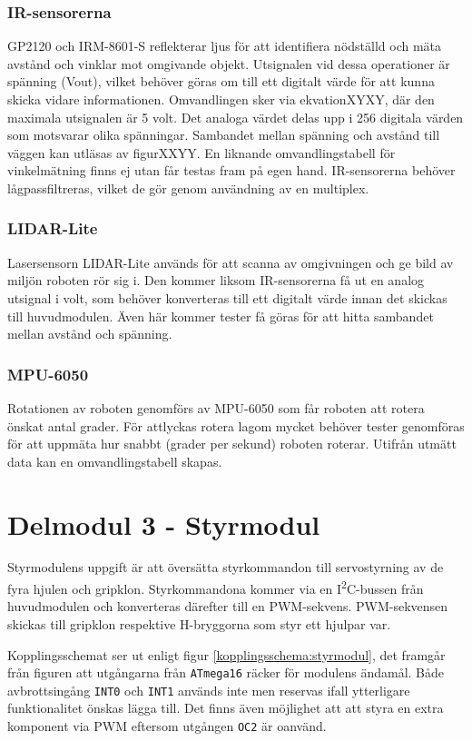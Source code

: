 \documentclass[11pt]{article}
\begin{document}
\begin{flushleft}
\subsubsection{IR-sensorerna}
GP2120 och IRM-8601-S reflekterar ljus för att identifiera nödställd och mäta avstånd och vinklar mot omgivande objekt. Utsignalen vid dessa operationer är spänning (Vout), vilket behöver göras om till ett digitalt värde för att kunna skicka vidare informationen. Omvandlingen sker via ekvationXYXY, där den maximala utsignalen är 5 volt. Det analoga värdet delas upp i 256 digitala värden som motsvarar olika spänningar. Sambandet mellan spänning och avstånd till väggen kan utläsas av figurXXYY. En liknande omvandlingstabell för vinkelmätning finns ej utan får testas fram på egen hand. IR-sensorerna behöver lågpassfiltreras, vilket de gör genom användning av en multiplex.

\subsubsection{LIDAR-Lite}
Lasersensorn LIDAR-Lite används för att scanna av omgivningen och ge bild av miljön roboten rör sig i. Den kommer liksom IR-sensorerna få ut en analog utsignal i volt, som behöver konverteras till ett digitalt värde innan det skickas till huvudmodulen. Även här kommer tester få göras för att hitta sambandet mellan avstånd och spänning.

\subsubsection{MPU-6050}
Rotationen av roboten genomförs av MPU-6050 som får roboten att rotera önskat antal grader. För attlyckas rotera lagom mycket behöver tester genomföras för att uppmäta hur snabbt (grader per sekund) roboten roterar. Utifrån utmätt data kan en omvandlingstabell skapas.

\pagebreak
\section{Delmodul 3 - Styrmodul}
Styrmodulens uppgift är att översätta styrkommandon till servostyrning av de fyra hjulen och gripklon. Styrkommandona kommer via en I\textsuperscript{2}C-bussen från huvudmodulen och konverteras därefter till en PWM-sekvens. PWM-sekvensen skickas till gripklon respektive H-bryggorna som styr ett hjulpar var. 

Kopplingsschemat ser ut enligt figur \ref{kopplingsschema:styrmodul}, det framgår från figuren att utgångarna från \verb+ATmega16+ räcker för modulens ändamål. Både avbrottsingång \verb+INT0+ och \verb+INT1+ används inte men reservas ifall ytterligare funktionalitet önskas lägga till. Det finns även möjlighet att att styra en extra komponent via PWM eftersom utgången \verb+OC2+ är oanvänd.  


\end{flushleft}
\end{document}
